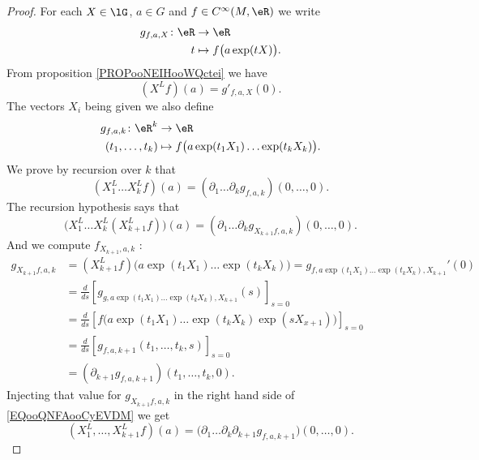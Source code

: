 \begin{proof}
	For each \( X\in \lG\), \( a\in G\) and \( f\in C^{\infty}(M,\eR) \) we write
	\begin{equation}
		\begin{aligned}
			g_{f,a,X}\colon \eR & \to \eR                         \\
			t                   & \mapsto f\big( a\exp(tX) \big).
		\end{aligned}
	\end{equation}
	From proposition \ref{PROPooNEIHooWQctei} we have
	\begin{equation}
		(X^Lf)(a)=g'_{f,a,X}(0).
	\end{equation}
	The vectors \( X_i\) being given we also define
	\begin{equation}
		\begin{aligned}
			g_{f,a,k}\colon \eR^k & \to \eR                                                \\
			(t_1,\ldots,t_k)      & \mapsto f\big( a\exp(t_1X_1)\ldots \exp(t_kX_k) \big).
		\end{aligned}
	\end{equation}
	We prove by recursion over \( k\) that
	\begin{equation}
		(X_1^L\ldots X_k^Lf)(a)=(\partial_1\ldots \partial_kg_{f,a,k})(0,\ldots,0).
	\end{equation}
	The recursion hypothesis says that
	\begin{equation}		\label{EQooQNFAooCyEVDM}
		\Big( X_1^L\ldots X_k^L(X^L_{k+1}f) \Big)(a)=(\partial_1\ldots \partial_kg_{X_{k+1}f,a,k})(0,\ldots,0).
	\end{equation}
	And we compute \( f_{X_{k+1},a,k}\) :
	\begin{subequations}
		\begin{align}
			g_{X_{k+1}f,a,k} & =(X_{k+1}^Lf)\big( a\exp(t_1X_1)\ldots \exp(t_kX_k) \big)  = g_{f,a\exp(t_1X_1)\ldots \exp(t_kX_k),X_{k+1}}'(0) \\
			                 & = \frac{d}{ds} \left[ g_{g,a\exp(t_1X_1)\ldots \exp(t_kX_k),X_{k+1}}(s)  \right]_{s=0}                          \\
			                 & =\frac{d}{ds} \left[ f\Big( a\exp(t_1X_1)\ldots \exp(t_kX_k)\exp(sX_{x+1}) \Big)  \right]_{s=0}                 \\
			                 & =\frac{d}{ds} \left[ g_{f,a,k+1}(t_1,\ldots,t_k,s)  \right]_{s=0}                                               \\
			                 & =(\partial_{k+1}g_{f,a,k+1})(t_1,\ldots,t_k,0).
		\end{align}
	\end{subequations}
	Injecting that value for \( g_{X_{k+1}f,a,k}\) in the right hand side of \eqref{EQooQNFAooCyEVDM} we get
	\begin{equation}
		(X_1^L,\ldots,X_{k+1}^Lf)(a)=\big( \partial_1\ldots\partial_k\partial_{k+1}g_{f,a,k+1} \big)(0,\ldots,0).
	\end{equation}
\end{proof}

